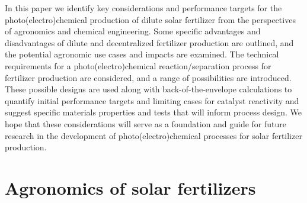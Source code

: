 In this paper we identify key considerations and performance targets for the photo(electro)chemical production of dilute solar fertilizer from the perspectives of agronomics and chemical engineering. Some specific advantages and disadvantages of dilute and decentralized fertilizer production are outlined, and the potential agronomic use cases and impacts are examined. The technical requirements for a photo(electro)chemical reaction/separation process for fertilizer production are considered, and a range of possibilities are introduced. These possible designs are used along with back-of-the-envelope calculations to quantify initial performance targets and limiting cases for catalyst reactivity and suggest specific materials properties and tests that will inform process design. We hope that these considerations will serve as a foundation and guide for future research in the development of photo(electro)chemical processes for solar fertilizer production.

\section{Agronomics of solar fertilizers}

